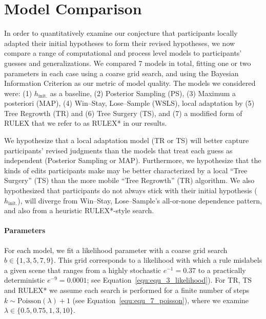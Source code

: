 \documentclass[doc,natbib,floatsintext]{apa7}
\newcommand{\hi}{h_{\mathrm{init.}}}
\begin{document}
\section{Model Comparison}

In order to quantitatively examine our conjecture that participants locally adapted their initial hypotheses to form their revised hypotheses, we now compare a range of computational and process level models to participants' guesses and generalizations. We compared 7 models in total, fitting one or two parameters in each case using a coarse grid search, and using the Bayesian Information Criterion \citep[BIC,][]{schwarz1978estimating} as our metric of model quality. The models we considered were: (1) $\hi$ as a baseline, (2) Posterior Sampling (PS), (3) Maximum a posteriori (MAP), (4) Win--Stay, Lose--Sample (WSLS), local adaptation by (5) Tree Regrowth (TR) and (6) Tree Surgery (TS), and (7) a modified form of RULEX that we refer to as RULEX* in our results.

We hypothesize that a local adaptation model (TR or TS) will better capture participants' revised judgments than the models that treat each guess as independent (Posterior Sampling or MAP). Furthermore, we hypothesize that the kinds of edits participants make may be better characterized by a local ``Tree Surgery'' (TS) than the more mobile ``Tree Regrowth'' (TR) algorithm. We also hypothesized that participants do not always stick with their initial hypothesis ($\hi$), will diverge from Win--Stay, Lose--Sample's all-or-none dependence pattern, and also from a heuristic RULEX*-style search.

\paragraph{Parameters}
For each model, we fit a likelihood parameter with a coarse grid search $b\in \{1, 3, 5, 7, 9\}$. This grid corresponds to a likelihood with which a rule mislabels a given scene that ranges from a highly stochastic $e^{-1}=0.37$ to a practically deterministic $e^{-9} = 0.0001$; see Equation~\ref{equ:equ_3_likelihood}). For TR, TS and RULEX* we assume each search is performed for a finite number of steps $k \sim \mathrm{Poisson}(\lambda)+1$ (see Equation~\ref{equ:equ_7_poisson}), where we examine $\lambda \in \{0.5, 0.75, 1, 3, 10\}$.
\end{document}
